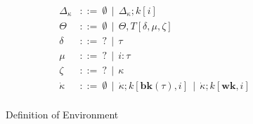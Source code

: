 \begin{figure}[t]
\begin{align*}
	\Delta_{\kappa} &::=~ \emptyset ~~ | ~~ \Delta_{\kappa};k[i]\\
	\Theta &::=~ \emptyset ~~ | ~~ \Theta,T[\delta,\mu,\zeta] \\
	\delta &::=~ ? ~~ | ~~ \tau\\
	\mu	   &::=~ ? ~~ | ~~ i:\tau\\
	\zeta  &::=~ ? ~~ | ~~ \kappa\\
	\dot\kappa        &::=~ \emptyset ~~ | ~~ \dot\kappa;k[\mathbf{bk}(\tau),i] ~~ | ~~ \dot\kappa;k[\mathbf{wk},i]\\
\end{align*}
\caption{Definition of Environment}
\label{typechecking-environment}
\end{figure}